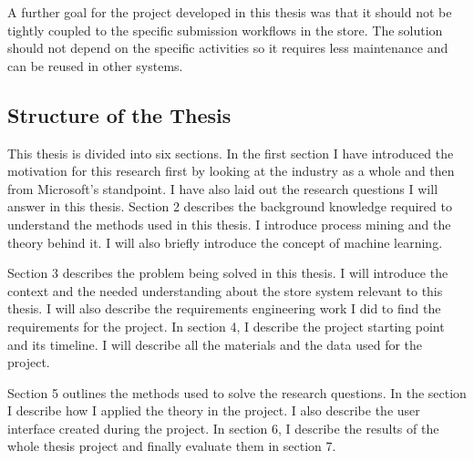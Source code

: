 A further goal for the project developed in this thesis was that it should not be tightly coupled to the 
specific submission workflows in the store. The solution should not depend on the specific activities so
it requires less maintenance and can be reused in other systems.

\subsection{Structure of the Thesis}
This thesis is divided into six sections. In the first section I have introduced the motivation for this research first by looking at the industry as a whole and then from Microsoft's standpoint.
I have also laid out the research questions I will answer in this thesis.
Section 2 describes the background knowledge required to understand the methods used in this thesis.
I introduce process mining and the theory behind it. I will also briefly introduce the concept of machine learning.

Section 3 describes the problem being solved in this thesis. I will introduce the context and the needed understanding about the store system relevant to this thesis. 
I will also describe the requirements engineering work I did to find the requirements for the project.
In section 4, I describe the project starting point and its timeline.
I will describe all the materials and the data used for the project.

Section 5 outlines the methods used to solve the research questions.
In the section I describe how I applied the theory in the project.
I also describe the user interface created during the project.
In section 6, I describe the results of the whole thesis project and finally evaluate them in section 7.
